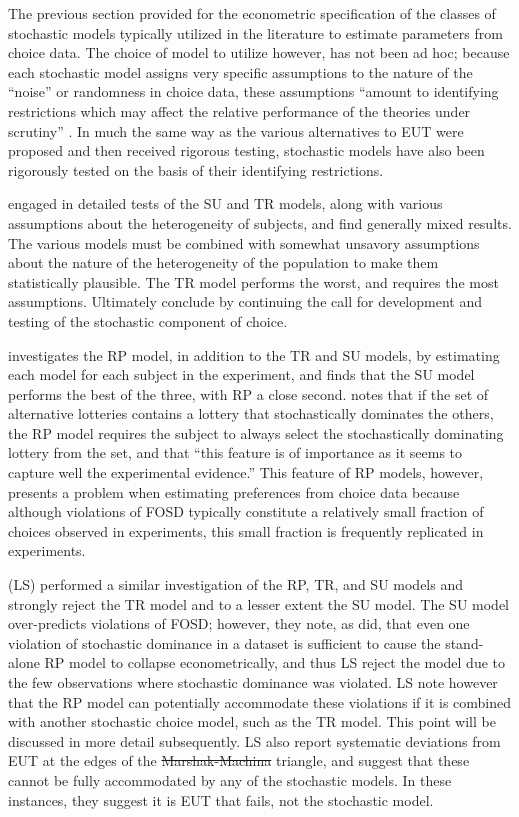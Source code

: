 \documentclass[11pt,a4paper]{report}
\providecommand{\DIFaddtex}[1]{{\protect\color{blue}\uwave{#1}}} %
\providecommand{\DIFdeltex}[1]{{\protect\color{red}\sout{#1}}}                      %
\providecommand{\DIFaddbegin}{} %
\providecommand{\DIFaddend}{} %
\providecommand{\DIFdelbegin}{} %
\providecommand{\DIFdelend}{} %
\providecommand{\DIFadd}[1]{\texorpdfstring{\DIFaddtex{#1}}{#1}} %
\providecommand{\DIFdel}[1]{\texorpdfstring{\DIFdeltex{#1}}{}} %
\newcommand{\DIFscaledelfig}{0.5}
\newlength{\DIFdelgraphicswidth} %
\newlength{\DIFdelgraphicsheight} %
\newcommand{\DIFaddincludegraphics}[2][]{{\color{blue}\fbox{\DIFOincludegraphics[#1]{#2}}}} %
\newcommand{\DIFdelincludegraphics}[2][]{%
\sbox{\DIFdelgraphicsbox}{\DIFOincludegraphics[#1]{#2}}%
\settoboxwidth{\DIFdelgraphicswidth}{\DIFdelgraphicsbox} %
\settoboxtotalheight{\DIFdelgraphicsheight}{\DIFdelgraphicsbox} %
\scalebox{\DIFscaledelfig}{%
\parbox[b]{\DIFdelgraphicswidth}{\usebox{\DIFdelgraphicsbox}\\[-\baselineskip] \rule{\DIFdelgraphicswidth}{0em}}\llap{\resizebox{\DIFdelgraphicswidth}{\DIFdelgraphicsheight}{%
\setlength{\unitlength}{\DIFdelgraphicswidth}%
\begin{picture}(1,1)%
\thicklines\linethickness{2pt} %
{\color[rgb]{1,0,0}\put(0,0){\framebox(1,1){}}}%
{\color[rgb]{1,0,0}\put(0,0){\line( 1,1){1}}}%
{\color[rgb]{1,0,0}\put(0,1){\line(1,-1){1}}}%
\end{picture}%
}\hspace*{3pt}}} %
} %
\DeclareRobustCommand{\DIFaddbegin}{\DIFOaddbegin \let\includegraphics\DIFaddincludegraphics} %
\DeclareRobustCommand{\DIFaddend}{\DIFOaddend \let\includegraphics\DIFOincludegraphics} %
\DeclareRobustCommand{\DIFdelbegin}{\DIFOdelbegin \let\includegraphics\DIFdelincludegraphics} %
\DeclareRobustCommand{\DIFdelend}{\DIFOaddend \let\includegraphics\DIFOincludegraphics} %
\begin{document}
The previous section provided for the econometric specification of the classes of stochastic models typically utilized in the literature to estimate parameters from choice data.
The choice of model to utilize however, has not been ad hoc;
because each stochastic model assigns very specific assumptions to the nature of the \enquote{noise} or randomness in choice data, these assumptions \enquote{amount to identifying restrictions which may affect the relative performance of the theories under scrutiny} \parencite[1091]{Ballinger1997}.
In much the same way as the various alternatives to EUT were proposed and then received rigorous testing, stochastic models have also been rigorously tested on the basis of their identifying restrictions.

\textcite{Ballinger1997} engaged in detailed tests of the SU and TR models, along with various assumptions about the heterogeneity of subjects, and find generally mixed results.
The various models must be combined with somewhat unsavory assumptions about the nature of the heterogeneity of the population to make them statistically plausible.
The TR model performs the worst, and requires the most assumptions.
Ultimately \textcite[1104]{Ballinger1997} conclude by continuing the call for development and testing of the stochastic component of choice.

\textcite{Carbone1997} investigates the RP model, in addition to the TR and SU models, by estimating each model for each subject in the experiment, and finds that the SU model performs the best of the three, with RP a close second.
\textcite[307]{Carbone1997} notes that if the set of alternative lotteries contains a lottery that stochastically dominates the others, the RP model requires the subject to always select the stochastically dominating lottery from the set, and that \enquote{this feature is of importance as it seems to capture well the experimental evidence.}
This feature of RP models, however, presents a problem when estimating preferences from choice data because although violations of FOSD typically constitute a relatively small fraction of choices observed in experiments, this small fraction is frequently replicated in experiments.

\textcite{Loomes1998} (LS) performed a similar investigation of the RP, TR, and SU models and strongly reject the TR model and to a lesser extent the SU model.
The SU model over-predicts violations of FOSD; however, they note, as \textcite{Carbone1997} did, that even one violation of stochastic dominance in a dataset is sufficient to cause the stand-alone RP model to collapse econometrically, and thus LS reject the model due to the few observations where stochastic dominance was violated.
LS note however that the RP model can potentially accommodate these violations if it is combined with another stochastic choice model, such as the TR model.
This point will be discussed in more detail subsequently.
LS also report systematic deviations from EUT at the edges of the \DIFdelbegin \DIFdel{Marshak-Machina }\DIFdelend \DIFaddbegin \DIFadd{Marschak-Machina }\DIFaddend triangle, and suggest that these cannot be fully accommodated by any of the stochastic models.
In these instances, they suggest it is EUT that fails, not the stochastic model.
\end{document}
